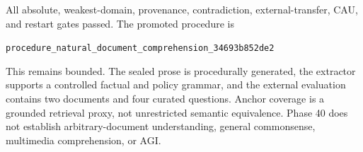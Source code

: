 All absolute, weakest-domain, provenance, contradiction, external-transfer,
CAU, and restart gates passed.  The promoted procedure is
\begin{center}
\small\texttt{procedure\_natural\_document\_comprehension\_34693b852de2}
\end{center}

This remains bounded.  The sealed prose is procedurally generated, the
extractor supports a controlled factual and policy grammar, and the external
evaluation contains two documents and four curated questions.  Anchor coverage
is a grounded retrieval proxy, not unrestricted semantic equivalence.  Phase
40 does not establish arbitrary-document understanding, general commonsense,
multimedia comprehension, or AGI.

